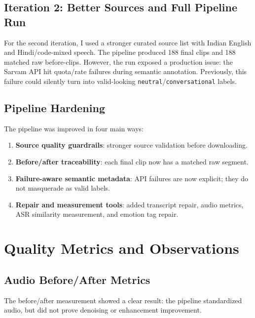 \documentclass[11pt]{article}
\begin{document}
\subsection{Iteration 2: Better Sources and Full Pipeline Run}

For the second iteration, I used a stronger curated source list with Indian English and Hindi/code-mixed speech. The pipeline produced 188 final clips and 188 matched raw before-clips. However, the run exposed a production issue: the Sarvam API hit quota/rate failures during semantic annotation. Previously, this failure could silently turn into valid-looking \texttt{neutral}/\texttt{conversational} labels.

\subsection{Pipeline Hardening}

The pipeline was improved in four main ways:
\begin{enumerate}
    \item \textbf{Source quality guardrails}: stronger source validation before downloading.
    \item \textbf{Before/after traceability}: each final clip now has a matched raw segment.
    \item \textbf{Failure-aware semantic metadata}: API failures are now explicit; they do not masquerade as valid labels.
    \item \textbf{Repair and measurement tools}: added transcript repair, audio metrics, ASR similarity measurement, and emotion tag repair.
\end{enumerate}

\section{Quality Metrics and Observations}

\subsection{Audio Before/After Metrics}

The before/after measurement showed a clear result: the pipeline standardized audio, but did not prove denoising or enhancement improvement.
\end{document}
